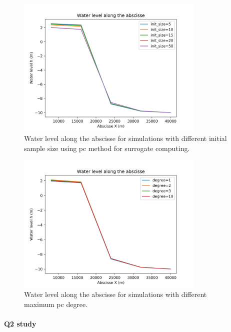 \begin{figure}
  \centering
  \includegraphics[width=0.8\textwidth]{images/influence_init_size_method_surrogate_pc.png}
  \caption{Water level along the abscisse for simulations with different initial sample size using pc method for surrogate computing.}
  	\label{influence_init_size_method_surrogate_pc}
\end{figure}

\begin{figure}
  \centering
  \includegraphics[width=0.8\textwidth]{images/influence_degree_method_surrogate_pc.png}
  \caption{Water level along the abscisse for simulations with different maximum pc degree.}
  	\label{influence_degree_method_surrogate_pc}
\end{figure}

\paragraph{Q2 study}
\hspace{1cm}

